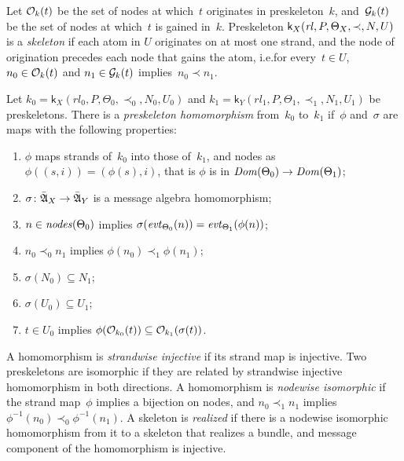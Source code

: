 \documentclass[12pt]{report}
\theoremstyle{definition}
\newcommand{\algbara}{\bar{\alg{A}}}
\newcommand{\sdom}{\fn{Dom}}
\newcommand{\evt}{\fn{evt}}
\newcommand{\skel}{\mathsf{k}}
\newcommand{\rl}{\fn{rl}}
\newcommand{\nodes}{\fn{nodes}}
\begin{document}
\begin{sloppypar}
Let $\mathcal{O}_k(t)$ be the set of nodes at which~$t$ originates in
preskeleton~$k$, and~$\mathcal{G}_k(t)$ be the set of nodes at which~$t$ is
gained in~$k$.  Preskeleton $\skel_X(\rl,P,\Theta_X,\prec,N,U)$ is a
\emph{skeleton} if each atom in $U$ originates on at
most one strand, and the node of origination precedes each node that
gains the atom, i.e.\@ for every~$t\in U$, $n_0\in\mathcal{O}_k(t)$ and
$n_1\in\mathcal{G}_k(t)$ implies~$n_0\prec n_1$.
\end{sloppypar}

Let $k_0=\skel_X(rl_0,P,\Theta_0,\prec_0,N_0,U_0)$ and
$k_1=\skel_Y(rl_1,P,\Theta_1,\prec_1,N_1,U_1)$ be preskeletons.  There
is a \emph{preskeleton
  homomorphism}\label{def:preskeleton homomorphism} from~$k_0$
to~$k_1$ if~$\phi$ and~$\sigma$ are maps with the following
properties:
\begin{enumerate}
\item $\phi$ maps strands of~$k_0$ into those of~$k_1$, and nodes as
  $\phi((s,i))=(\phi(s),i)$, that is $\phi$ is in
  $\sdom(\Theta_0)\to\sdom(\Theta_1)$;
\item $\sigma\colon\algbara_X\to\algbara_Y$ is a message algebra homomorphism;
\item $n\in\nodes(\Theta_0)$ implies
  $\sigma(\evt_{\Theta_0}(n))=\evt_{\Theta_1}(\phi(n))$;
\item $n_0\prec_0
n_1$ implies $\phi(n_0)\prec_1\phi(n_1)$;
\item $\sigma(N_0)\subseteq N_1$;
\item $\sigma(U_0)\subseteq U_1$;
\item $t\in U_0$ implies
  $\phi(\mathcal{O}_{k_0}(t))\subseteq\mathcal{O}_{k_1}(\sigma(t))$.
\end{enumerate}

A homomorphism is \emph{strandwise injective} if its strand map is
injective.  Two preskeletons are isomorphic if they are related by
\label{def:isomorphic preskeletons}
strandwise injective homomorphism in both directions.  A homomorphism
is \emph{nodewise
  isomorphic} if the strand map~$\phi$ implies a bijection on nodes,
and $n_0\prec_1 n_1$ implies $\phi^{-1}(n_0)\prec_0\phi^{-1}(n_1)$.  A
skeleton is \emph{realized} if there is a
nodewise isomorphic homomorphism from it to a skeleton that realizes a
bundle, and message component of the homomorphism is injective.
\end{document}
